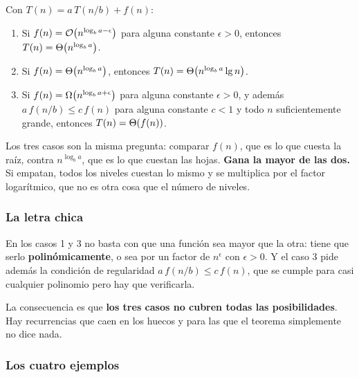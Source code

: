 \documentclass[11pt,letterpaper]{article}
\begin{document}
\begin{teorema}
  \label{teo:maestro}
  Con $T(n) = a\,T(n/b) + f(n)$:
  \begin{enumerate}[itemsep=0.25em]
    \item Si $f(n) = \mathcal{O}\!\left(n^{\log_b a - \epsilon}\right)$ para alguna
          constante $\epsilon > 0$, entonces
          $T(n) = \Theta\!\left(n^{\log_b a}\right)$.
    \item Si $f(n) = \Theta\!\left(n^{\log_b a}\right)$, entonces
          $T(n) = \Theta\!\left(n^{\log_b a} \lg n\right)$.
    \item Si $f(n) = \Omega\!\left(n^{\log_b a + \epsilon}\right)$ para alguna
          constante $\epsilon > 0$, y además
          $a\,f(n/b) \leq c\,f(n)$ para alguna constante $c < 1$ y
          todo $n$ suficientemente grande, entonces
          $T(n) = \Theta\!\left(f(n)\right)$.
  \end{enumerate}
\end{teorema}

\begin{idea}
  Los tres casos son la misma pregunta: comparar $f(n)$, que es lo que
  cuesta la raíz, contra $n^{\log_b a}$, que es lo que cuestan las
  hojas. \textbf{Gana la mayor de las dos.} Si empatan, todos los
  niveles cuestan lo mismo y se multiplica por el factor logarítmico,
  que no es otra cosa que el número de niveles.
\end{idea}

\subsubsection*{La letra chica}

\begin{ojo}
  En los casos 1 y 3 no basta con que una función sea mayor que la
  otra: tiene que serlo \textbf{polinómicamente}, o sea por un factor
  de $n^{\epsilon}$ con $\epsilon > 0$. Y el caso 3 pide además la
  condición de regularidad $a\,f(n/b) \leq c\,f(n)$, que se cumple
  para casi cualquier polinomio pero hay que verificarla.

  La consecuencia es que \textbf{los tres casos no cubren todas las
  posibilidades}. Hay recurrencias que caen en los huecos y para las
  que el teorema simplemente no dice nada.
\end{ojo}

\subsubsection*{Los cuatro ejemplos}
\end{document}
